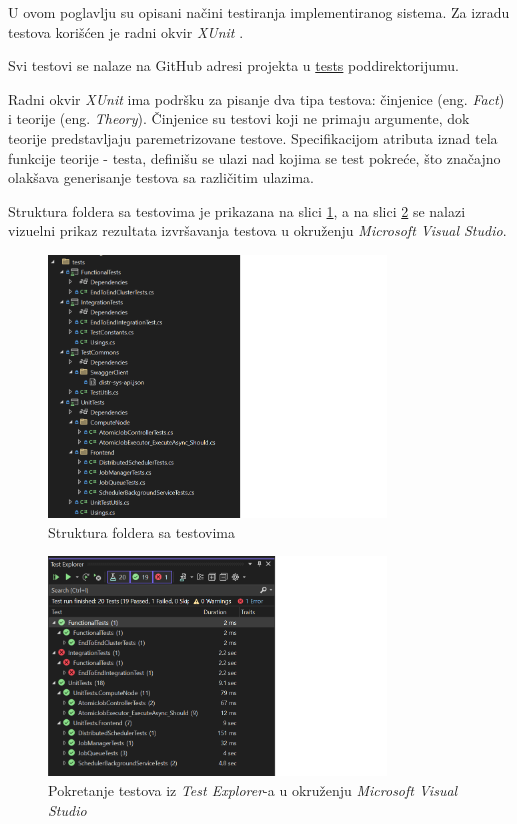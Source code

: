 \documentclass[12pt,oneside]{memoir}
\begin{document}
U ovom poglavlju su opisani načini testiranja implementiranog sistema. Za izradu testova korišćen je radni okvir \emph{XUnit} \cite{XUnit}.

Svi testovi se nalaze na GitHub adresi projekta u \href{https://github.com/milana-kovacevic/DistributedComputationSystem/tree/main/tests}{tests} poddirektorijumu.

Radni okvir \emph{XUnit} ima podršku za pisanje dva tipa testova: činjenice (eng. \emph{Fact}) i teorije (eng. \emph{Theory}). Činjenice su testovi koji ne primaju argumente, dok teorije predstavljaju paremetrizovane testove. Specifikacijom atributa iznad tela funkcije teorije - testa, definišu se ulazi nad kojima se test pokreće, što značajno olakšava generisanje testova sa različitim ulazima.

Struktura foldera sa testovima je prikazana na slici \ref{fig:testovi}, a na slici \ref{fig:testexplorer} se nalazi vizuelni prikaz rezultata izvršavanja testova u okruženju \emph{Microsoft Visual Studio}.

\begin{figure}[!ht]
  \centering
  \includegraphics[width=0.8\textwidth]{./images/testovi.png}
  \caption{Struktura foldera sa testovima}
  \label{fig:testovi}
\end{figure}

\begin{figure}[!ht]
  \centering
  \includegraphics[width=0.8\textwidth]{./images/testexplorer.png}
  \caption{Pokretanje testova iz \emph{Test Explorer}-a u okruženju \emph{Microsoft Visual Studio}}
  \label{fig:testexplorer}
\end{figure}
\end{document}

